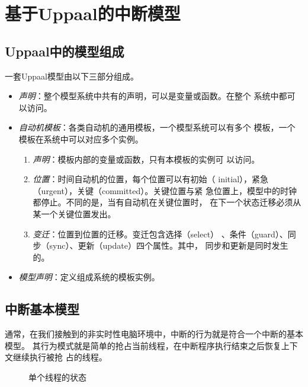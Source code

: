 
\chapter{基于Uppaal的中断模型}
\label{cha:intr}

\section{Uppaal中的模型组成}
\label{sec:model_combine}	
一套Uppaal模型由以下三部分组成。
\begin{itemize}
	\item \emph{声明}：整个模型系统中共有的声明，可以是变量或函数。在整个
	系统中都可以访问。
	\item \emph{自动机模板}：各类自动机的通用模板，一个模型系统可以有多个
	模板，一个模板在系统中可以对应多个实例。
		\begin{enumerate}[(1)]
			\item \emph{声明}：模板内部的变量或函数，只有本模板的实例可
			以访问。
			\item \emph{位置}：时间自动机的位置，每个位置可以有初始（
			initial），紧急（urgent），关键（committed）。关键位置与紧
			急位置上，模型中的时钟都停止。不同的是，当有自动机在关键位置时，
			在下一个状态迁移必须从某一个关键位置发出。
			\item \emph{变迁}：位置到位置的迁移。变迁包含选择（select）
			、条件（guard）、同步（sync）、更新（update）四个属性。其中，
			同步和更新是同时发生的。
		\end{enumerate}	
	\item \emph{模型声明}：定义组成系统的模板实例。
\end{itemize}

\section{中断基本模型}
\label{sec:basic}
通常，在我们接触到的非实时性电脑环境中，中断的行为就是符合一个中断的基本模型。
其行为模式就是简单的抢占当前线程，在中断程序执行结束之后恢复上下文继续执行被抢
占的线程。

\begin{figure}[H]
	\centering
	
	\caption{单个线程的状态}
	\label{fig:thread_state}
\end{figure}

